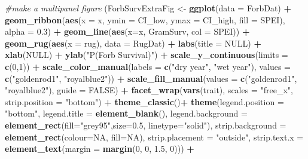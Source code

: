 \documentclass[
]{article}
\newenvironment{Shaded}{\begin{snugshade}}{\end{snugshade}}
\newcommand{\CommentTok}[1]{\textcolor[rgb]{0.56,0.35,0.01}{\textit{#1}}}
\newcommand{\DataTypeTok}[1]{\textcolor[rgb]{0.13,0.29,0.53}{#1}}
\newcommand{\DecValTok}[1]{\textcolor[rgb]{0.00,0.00,0.81}{#1}}
\newcommand{\FloatTok}[1]{\textcolor[rgb]{0.00,0.00,0.81}{#1}}
\newcommand{\KeywordTok}[1]{\textcolor[rgb]{0.13,0.29,0.53}{\textbf{#1}}}
\newcommand{\NormalTok}[1]{#1}
\newcommand{\OperatorTok}[1]{\textcolor[rgb]{0.81,0.36,0.00}{\textbf{#1}}}
\newcommand{\OtherTok}[1]{\textcolor[rgb]{0.56,0.35,0.01}{#1}}
\newcommand{\StringTok}[1]{\textcolor[rgb]{0.31,0.60,0.02}{#1}}
\begin{document}
\begin{Shaded}
\begin{Highlighting}[]
\CommentTok{\#make a multipanel figure}
\NormalTok{(ForbSurvExtraFig \textless{}{-}}\StringTok{ }\KeywordTok{ggplot}\NormalTok{(}\DataTypeTok{data =}\NormalTok{ ForbDat) }\OperatorTok{+}
\StringTok{  }\KeywordTok{geom\_ribbon}\NormalTok{(}\KeywordTok{aes}\NormalTok{(}\DataTypeTok{x =}\NormalTok{ x, }\DataTypeTok{ymin =}\NormalTok{ CI\_low, }\DataTypeTok{ymax =}\NormalTok{ CI\_high, }\DataTypeTok{fill =}\NormalTok{ SPEI), }\DataTypeTok{alpha =} \FloatTok{0.3}\NormalTok{) }\OperatorTok{+}
\StringTok{  }\KeywordTok{geom\_line}\NormalTok{(}\KeywordTok{aes}\NormalTok{(}\DataTypeTok{x=}\NormalTok{x, GramSurv, }\DataTypeTok{col =}\NormalTok{ SPEI))  }\OperatorTok{+}\StringTok{ }
\StringTok{  }\KeywordTok{geom\_rug}\NormalTok{(}\KeywordTok{aes}\NormalTok{(}\DataTypeTok{x =}\NormalTok{ rug), }\DataTypeTok{data =}\NormalTok{ RugDat) }\OperatorTok{+}
\StringTok{  }\KeywordTok{labs}\NormalTok{(}\DataTypeTok{title =} \OtherTok{NULL}\NormalTok{) }\OperatorTok{+}
\StringTok{  }\KeywordTok{xlab}\NormalTok{(}\OtherTok{NULL}\NormalTok{) }\OperatorTok{+}
\StringTok{  }\KeywordTok{ylab}\NormalTok{(}\StringTok{"P(Forb Survival)"}\NormalTok{) }\OperatorTok{+}
\StringTok{  }\KeywordTok{scale\_y\_continuous}\NormalTok{(}\DataTypeTok{limits =} \KeywordTok{c}\NormalTok{(}\DecValTok{0}\NormalTok{,}\DecValTok{1}\NormalTok{)) }\OperatorTok{+}
\StringTok{  }\KeywordTok{scale\_color\_manual}\NormalTok{(}\DataTypeTok{labels =} \KeywordTok{c}\NormalTok{(}\StringTok{"dry year"}\NormalTok{, }\StringTok{"wet year"}\NormalTok{), }\DataTypeTok{values =} \KeywordTok{c}\NormalTok{(}\StringTok{"goldenrod1"}\NormalTok{, }\StringTok{"royalblue2"}\NormalTok{)) }\OperatorTok{+}
\StringTok{  }\KeywordTok{scale\_fill\_manual}\NormalTok{(}\DataTypeTok{values =} \KeywordTok{c}\NormalTok{(}\StringTok{"goldenrod1"}\NormalTok{, }\StringTok{"royalblue2"}\NormalTok{), }\DataTypeTok{guide =} \OtherTok{FALSE}\NormalTok{) }\OperatorTok{+}
\StringTok{  }\KeywordTok{facet\_wrap}\NormalTok{(}\KeywordTok{vars}\NormalTok{(trait), }\DataTypeTok{scales =} \StringTok{"free\_x"}\NormalTok{, }\DataTypeTok{strip.position =}  \StringTok{"bottom"}\NormalTok{) }\OperatorTok{+}
\StringTok{  }\KeywordTok{theme\_classic}\NormalTok{()}\OperatorTok{+}
\StringTok{  }\KeywordTok{theme}\NormalTok{(}\DataTypeTok{legend.position =} \StringTok{"bottom"}\NormalTok{, }\DataTypeTok{legend.title =} \KeywordTok{element\_blank}\NormalTok{(), }\DataTypeTok{legend.background =} \KeywordTok{element\_rect}\NormalTok{(}\DataTypeTok{fill=}\StringTok{"grey95"}\NormalTok{,}\DataTypeTok{size=}\FloatTok{0.5}\NormalTok{, }\DataTypeTok{linetype=}\StringTok{"solid"}\NormalTok{), }\DataTypeTok{strip.background =} \KeywordTok{element\_rect}\NormalTok{(}\DataTypeTok{colour=}\OtherTok{NA}\NormalTok{, }\DataTypeTok{fill=}\OtherTok{NA}\NormalTok{), }\DataTypeTok{strip.placement =} \StringTok{"outside"}\NormalTok{, }\DataTypeTok{strip.text.x =} \KeywordTok{element\_text}\NormalTok{(}\DataTypeTok{margin =} \KeywordTok{margin}\NormalTok{(}\DecValTok{0}\NormalTok{, }\DecValTok{0}\NormalTok{, }\FloatTok{1.5}\NormalTok{, }\DecValTok{0}\NormalTok{))) }\OperatorTok{+}

\end{Highlighting}
\end{Shaded}
\end{document}
